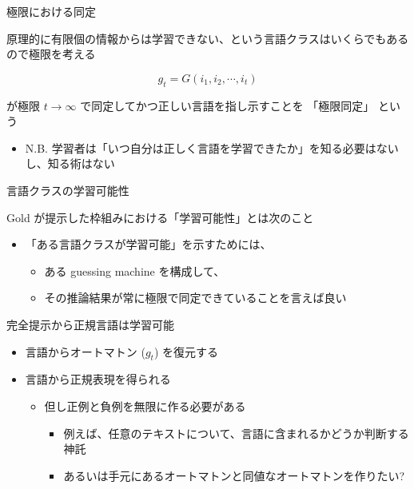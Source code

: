 \documentclass[professionalfont, 12pt, dvipdfmx, default, cjk]{beamer}
\def\emph#1{\alert{#1}}
\begin{document}
\begin{frame}{極限における同定}

原理的に有限個の情報からは学習できない、という言語クラスはいくらでもあるので極限を考える

\[g_t = G(i_1, i_2, \cdots, i_t)\]

が極限 \(t \rightarrow \infty\) で同定してかつ正しい言語を指し示すことを
「極限同定」 という

\begin{itemize}
\itemsep1pt\parskip0pt
\item
  \emph{N.B.}
  学習者は「いつ自分は正しく言語を学習できたか」を知る必要はないし、知る術はない
\end{itemize}

\end{frame}

\begin{frame}{言語クラスの学習可能性}

Gold が提示した枠組みにおける「学習可能性」とは次のこと

\vspace*{4mm}

\begin{itemize}
\itemsep1pt\parskip0pt
\item
  「ある言語クラスが学習可能」を示すためには、

  \begin{itemize}
  \itemsep1pt\parskip0pt
  \item
    ある guessing machine を構成して、
  \item
    その推論結果が常に極限で同定できていることを言えば良い
  \end{itemize}
\end{itemize}

\end{frame}

\begin{frame}{完全提示から正規言語は学習可能}

\begin{itemize}
\itemsep1pt\parskip0pt
\item
  言語からオートマトン (\(g_t\)) を復元する
\item
  言語から正規表現を得られる

  \begin{itemize}
  \itemsep1pt\parskip0pt
  \item
    但し正例と負例を無限に作る必要がある

    \begin{itemize}
    \itemsep1pt\parskip0pt
    \item
      例えば、任意のテキストについて、言語に含まれるかどうか判断する神託
    \item
      あるいは手元にあるオートマトンと同値なオートマトンを作りたい?
    \end{itemize}
  \end{itemize}
\end{itemize}

\end{frame}
\end{document}
